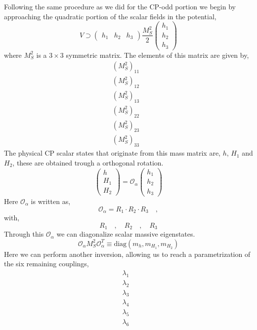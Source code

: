 Following the same procedure as we did for the CP-odd portion we begin by approaching the quadratic portion of the scalar fields in the potential,
%
\begin{equation}
V \supset \left( \begin{array}{ccc} 
h_1 & h_2 & h_3 
\end{array} \right) 
\frac{M_S^2}{2} \left( \begin{array}{c}
h_1 \\ 
h_2 \\
h_3
\end{array} \right) 
\end{equation}
where $M_S^2$ is a $3\times3$ symmetric matrix. The elements of this matrix are given by,
\begin{equation}
\begin{split}
\left(M_S^2\right)_{11} & \\
\left(M_S^2\right)_{12} & \\
\left(M_S^2\right)_{13} & \\
\left(M_S^2\right)_{22} & \\
\left(M_S^2\right)_{23} & \\
\left(M_S^2\right)_{33} & 
\end{split}
\end{equation}
The physical CP scalar states that originate from this mass matrix are, $h$, $H_1$ and $H_2$, these are obtained trough a orthogonal rotation.
\begin{equation}
\left( 
\begin{array}{c}
h   \\
H_1 \\
H_2 
\end{array} 
\right) = \mathcal{O}_\alpha \left( 
\begin{array}{c}
h_1 \\
h_2 \\
h_3 
\end{array} 
\right)
\end{equation} 
Here $\mathcal{O}_\alpha$ is written as, 
\begin{equation}
\mathcal{O}_\alpha = R_1 \cdot R_2 \cdot R_3 \quad , 
\end{equation}
with, 
\begin{equation}
R_1 \quad , \quad R_2 \quad , \quad R_3 
\end{equation}
Through this $\mathcal{O}_\alpha$ we can diagonalize scalar massive eigenstates. 
\begin{equation}
\mathcal{O}_\alpha M^2_S \mathcal{O}_\alpha^T \equiv \text{diag}(m_h,m_{H_1},m_{H_2})
\end{equation}
Here we can perform another inversion, allowing us to reach a parametrization of the six remaining couplings, 
\begin{equation}
\begin{split}
\lambda_1 & \\ 
\lambda_2 & \\ 
\lambda_3 & \\ 
\lambda_4 & \\ 
\lambda_5 & \\ 
\lambda_6 & 
\end{split} 
\end{equation}

